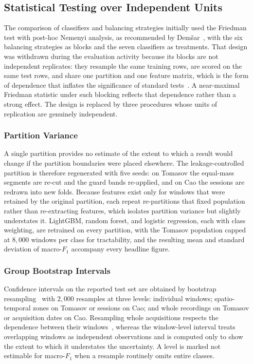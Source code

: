 \subsection{Statistical Testing over Independent Units}
\label{sec:chap3Statistics}
The comparison of classifiers and balancing strategies initially used the Friedman test with post-hoc Nemenyi analysis, as recommended by Dem\v{s}ar~\cite{demsar2006statistical}, with the six balancing strategies as blocks and the seven classifiers as treatments. That design was withdrawn during the evaluation activity because its blocks are not independent replicates: they resample the same training rows, are scored on the same test rows, and share one partition and one feature matrix, which is the form of dependence that inflates the significance of standard tests~\cite{dietterich1998tests,nadeau2003inference}. A near-maximal Friedman statistic under such blocking reflects that dependence rather than a strong effect. The design is replaced by three procedures whose units of replication are genuinely independent.

\subsubsection{Partition Variance}
\label{sec:chap3PartitionVariance}
A single partition provides no estimate of the extent to which a result would change if the partition boundaries were placed elsewhere. The leakage-controlled partition is therefore regenerated with five seeds: on Tomasov the equal-mass segments are re-cut and the guard bands re-applied, and on Cao the sessions are redrawn into new folds. Because features exist only for windows that were retained by the original partition, each repeat re-partitions that fixed population rather than re-extracting features, which isolates partition variance but slightly understates it. LightGBM, random forest, and logistic regression, each with class weighting, are retrained on every partition, with the Tomasov population capped at $8{,}000$ windows per class for tractability, and the resulting mean and standard deviation of macro-$F_1$ accompany every headline figure.

\subsubsection{Group Bootstrap Intervals}
\label{sec:chap3Bootstrap}
Confidence intervals on the reported test set are obtained by bootstrap resampling~\cite{efron1979bootstrap} with $2{,}000$ resamples at three levels: individual windows; spatio-temporal zones on Tomasov or sessions on Cao; and whole recordings on Tomasov or acquisition dates on Cao. Resampling whole acquisitions respects the dependence between their windows~\cite{field2007clustered}, whereas the window-level interval treats overlapping windows as independent observations and is computed only to show the extent to which it understates the uncertainty. A level is marked not estimable for macro-$F_1$ when a resample routinely omits entire classes.

